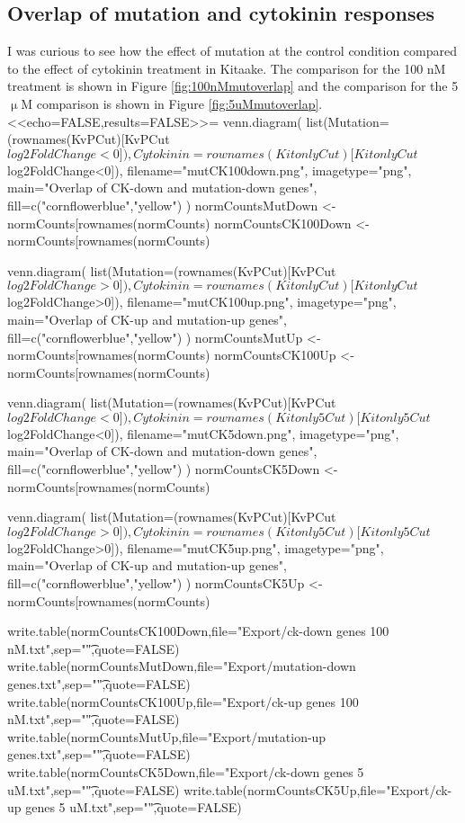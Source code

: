\documentclass{article}
\begin{document}
{{{{\subsection{Overlap of mutation and cytokinin responses}
I was curious to see how the effect of mutation at the control condition compared to the effect of cytokinin treatment in Kitaake. The comparison for the 100 nM treatment is shown in Figure \ref{fig:100nMmutoverlap} and the comparison for the 5 $\upmu$M comparison is shown in Figure \ref{fig:5uMmutoverlap}.
<<echo=FALSE,results=FALSE>>=
venn.diagram(
	list(Mutation=(rownames(KvPCut)[KvPCut$log2FoldChange<0]),
		Cytokinin=rownames(KitonlyCut)[KitonlyCut$log2FoldChange<0]),
	filename="mutCK100down.png",
	imagetype="png",
	main="Overlap of CK-down and mutation-down genes",
	fill=c("cornflowerblue","yellow")
	)
normCountsMutDown <- normCounts[rownames(normCounts) %
normCountsCK100Down <- normCounts[rownames(normCounts) %
	
venn.diagram(
	list(Mutation=(rownames(KvPCut)[KvPCut$log2FoldChange>0]),
		Cytokinin=rownames(KitonlyCut)[KitonlyCut$log2FoldChange>0]),
	filename="mutCK100up.png",
	imagetype="png",
	main="Overlap of CK-up and mutation-up genes",
	fill=c("cornflowerblue","yellow")
	)
normCountsMutUp <- normCounts[rownames(normCounts) %
normCountsCK100Up <- normCounts[rownames(normCounts) %

venn.diagram(
	list(Mutation=(rownames(KvPCut)[KvPCut$log2FoldChange<0]),
		Cytokinin=rownames(Kitonly5Cut)[Kitonly5Cut$log2FoldChange<0]),
	filename="mutCK5down.png",
	imagetype="png",
	main="Overlap of CK-down and mutation-down genes",
	fill=c("cornflowerblue","yellow")
	)
normCountsCK5Down <- normCounts[rownames(normCounts) %

venn.diagram(
	list(Mutation=(rownames(KvPCut)[KvPCut$log2FoldChange>0]),
		Cytokinin=rownames(Kitonly5Cut)[Kitonly5Cut$log2FoldChange>0]),
	filename="mutCK5up.png",
	imagetype="png",
	main="Overlap of CK-up and mutation-up genes",
	fill=c("cornflowerblue","yellow")
	)
normCountsCK5Up <- normCounts[rownames(normCounts) %

write.table(normCountsCK100Down,file="Export/ck-down genes 100 nM.txt",sep="\t",quote=FALSE)
write.table(normCountsMutDown,file="Export/mutation-down genes.txt",sep="\t",quote=FALSE)
write.table(normCountsCK100Up,file="Export/ck-up genes 100 nM.txt",sep="\t",quote=FALSE)
write.table(normCountsMutUp,file="Export/mutation-up genes.txt",sep="\t",quote=FALSE)
write.table(normCountsCK5Down,file="Export/ck-down genes 5 uM.txt",sep="\t",quote=FALSE)
write.table(normCountsCK5Up,file="Export/ck-up genes 5 uM.txt",sep="\t",quote=FALSE)

}}}}
\end{document}
